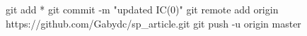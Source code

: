 git add *
git commit -m "updated IC(0)"
git remote add origin https://github.com/Gabydc/sp_article.git
git push -u origin master
